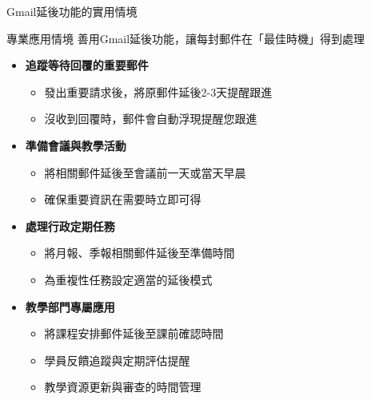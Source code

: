 \documentclass[aspectratio=169]{beamer}
\begin{document}
\begin{frame}{Gmail延後功能的實用情境}
  \begin{block}{專業應用情境}
    善用Gmail延後功能，讓每封郵件在「最佳時機」得到處理
  \end{block}

  \begin{itemize}
    \item \textbf{追蹤等待回覆的重要郵件}
      \begin{itemize}
        \item 發出重要請求後，將原郵件延後2-3天提醒跟進
        \item 沒收到回覆時，郵件會自動浮現提醒您跟進
      \end{itemize}
    
    \item \textbf{準備會議與教學活動}
      \begin{itemize}
        \item 將相關郵件延後至會議前一天或當天早晨
        \item 確保重要資訊在需要時立即可得
      \end{itemize}
    
    \item \textbf{處理行政定期任務}
      \begin{itemize}
        \item 將月報、季報相關郵件延後至準備時間
        \item 為重複性任務設定適當的延後模式
      \end{itemize}
    
    \item \textbf{教學部門專屬應用}
      \begin{itemize}
        \item 將課程安排郵件延後至課前確認時間
        \item 學員反饋追蹤與定期評估提醒
        \item 教學資源更新與審查的時間管理
      \end{itemize}
  \end{itemize}
\end{frame}
\end{document}
